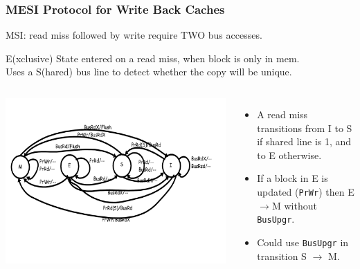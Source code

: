 \documentclass{beamer}
\newcommand{\emp}[1]{\textcolor{DikuRed}{ #1}}
\begin{document}
\begin{frame}[fragile,t]
\frametitle{MESI Protocol for Write Back Caches}

MSI: read miss followed by write require TWO bus accesses.\smallskip

\emp{E(xclusive)} State entered on a read miss, when block is only in mem.\\
Uses a \emp{S(hared) bus line} to detect whether the copy will be unique.


\begin{columns}\hspace{-7ex}
\includegraphics[width=55ex]{Figures/FigsInfCoherence/MESI}\pause
{}
\vspace{-3ex}
\begin{itemize}
    \item A read miss transitions from I to S if shared line is 1, and to E otherwise.
    \item If a block in E is updated ({\tt PrWr}) then E$\rightarrow$M without {\tt BusUpgr}.
    \item Could use {\tt BusUpgr} in transition S $\rightarrow$ M. 
\end{itemize}
\end{columns}

\end{frame}
\end{document}
